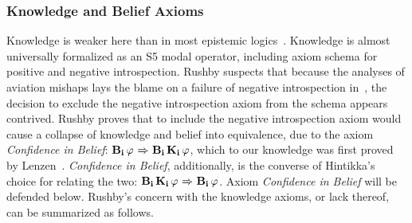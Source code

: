 

\subsubsection*{Knowledge and Belief Axioms}
Knowledge is weaker here than in most epistemic logics~\cite{FHMV,DEL,Hintikka}. Knowledge is almost universally formalized as an S5 modal operator, including axiom schema for positive and negative introspection. Rushby suspects that because the analyses of aviation mishaps lays the blame on a failure of negative introspection in~\cite{AhrenbachGoodloe}, the decision to exclude the negative introspection axiom from the schema appears contrived. Rushby proves that to include the negative introspection axiom would cause a collapse of knowledge and belief into equivalence, due to the axiom \emph{Confidence in Belief}: $\mathbf{B}_{\mathbf{i}}\,\varphi {\ \Rightarrow \ } \mathbf{B}_{\mathbf{i}}\,\mathbf{K}_{\mathbf{i}}\,\varphi$, which to our knowledge was first proved by Lenzen~\cite{Lenzen}. \emph{Confidence in Belief}, additionally, is the converse of Hintikka's choice for relating the two: $\mathbf{B}_{\mathbf{i}}\,\mathbf{K}_{\mathbf{i}}\,\varphi {\ \Rightarrow \ } \mathbf{B}_{\mathbf{i}}\,\varphi$. Axiom \emph{Confidence in Belief} will be defended below. Rushby's concern with the knowledge axioms, or lack thereof, can be summarized as follows.
%

